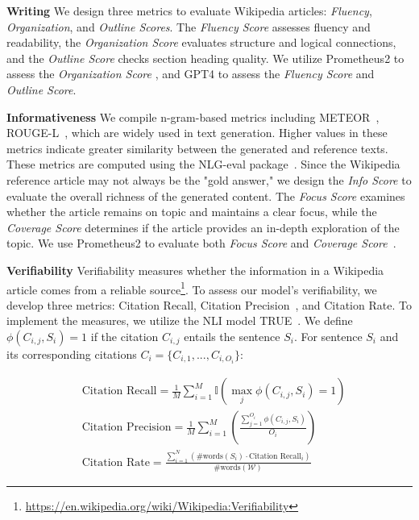 \documentclass[11pt]{article}
\begin{document}
\noindent \textbf{Writing}\quad 
We design three metrics to evaluate Wikipedia articles: \textit{Fluency}, \textit{Organization}, and \textit{Outline Scores}. The \textit{Fluency Score} assesses fluency and readability, the \textit{Organization Score} evaluates structure and logical connections, and the \textit{Outline Score} checks section heading quality. We utilize Prometheus2 to assess the \textit{Organization Score} \cite{shao2024assisting}, and GPT4 to assess the \textit{Fluency Score} and \textit{Outline Score}.

\noindent \textbf{Informativeness}\quad 
We compile n-gram-based metrics including METEOR~\citep{banerjee-lavie-2005-meteor}, ROUGE-L~\citep{lin-2004-rouge}, which are widely used in text generation. Higher values in these metrics indicate greater similarity between the generated and reference texts. These metrics are computed using the NLG-eval package~\citep{sharma2017relevance}. Since the Wikipedia reference article may not always be the "gold answer," we design the \textit{Info Score} to evaluate the overall richness of the generated content. The \textit{Focus Score} examines whether the article remains on topic and maintains a clear focus, while the \textit{Coverage Score} determines if the article provides an in-depth exploration of the topic. We use Prometheus2 to evaluate both \textit{Focus Score} and \textit{Coverage Score}~\cite{shao2024assisting}.

\noindent \textbf{Verifiability}\quad 
Verifiability measures whether the information in a Wikipedia article comes from a reliable source\footnote{\url{https://en.wikipedia.org/wiki/Wikipedia:Verifiability}}. To assess our model's verifiability, we develop three metrics: Citation Recall, Citation Precision~\citep{liu-etal-2023-evaluating}, and Citation Rate. 
To implement the measures,  
we utilize the NLI model TRUE~\citep{honovich-etal-2022-true}. 
We define $\phi(C_{i,j}, S_i) = 1$ if the citation $C_{i,j}$ entails the sentence $S_i$. For sentence $S_i$ and its corresponding citations $C_i = \{C_{i,1}, ..., C_{i,O_i}\}$:

\begingroup
\small
\begin{align}
&\text{}\text{Citation Recall} = \frac{1}{M} \sum_{i=1}^{M} \mathbb{I} \left( \max_{j} \phi(C_{i,j}, S_i) = 1 \right) \\
&\text{}\text{Citation Precision} = \frac{1}{M} \sum_{i=1}^{M} \left( \frac{\sum_{j=1}^{O_i} \phi(C_{i,j}, S_i)}{O_i} \right) \\
&\text{}\text{Citation Rate} = \frac{\sum_{i=1}^{N} (\text{\#words}(S_i) \cdot \text{Citation Recall}_i)}{\text{\#words}(\mathcal{W})}
\end{align}
\endgroup
\end{document}
